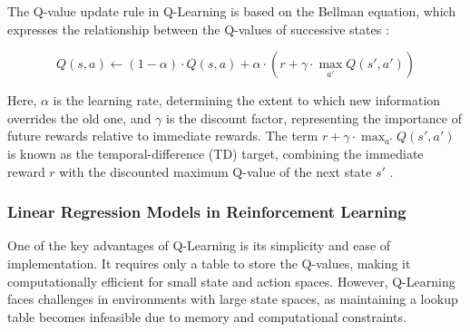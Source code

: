 The Q-value update rule in Q-Learning is based on the Bellman equation, which expresses the relationship between the Q-values of successive states \cite{russel2020ai}:

\[
Q(s, a) \leftarrow (1 - \alpha) \cdot Q(s, a) + \alpha \cdot \left( r + \gamma \cdot \max_{a'} Q(s', a') \right)
\]

Here, $\alpha$ is the learning rate, determining the extent to which new information overrides the old one, and $\gamma$ is the discount factor, representing the importance of future rewards relative to immediate rewards. The term $r + \gamma \cdot \max_{a'} Q(s', a')$ is known as the temporal-difference (TD) target, combining the immediate reward $r$ with the discounted maximum Q-value of the next state $s'$ \cite{russel2020ai}.




\subsubsection{Linear Regression Models in Reinforcement Learning}

One of the key advantages of Q-Learning is its simplicity and ease of implementation. It requires only a table to store the Q-values, making it computationally efficient for small state and action spaces. However, Q-Learning faces challenges in environments with large state spaces, as maintaining a lookup table becomes infeasible due to memory and computational constraints.

